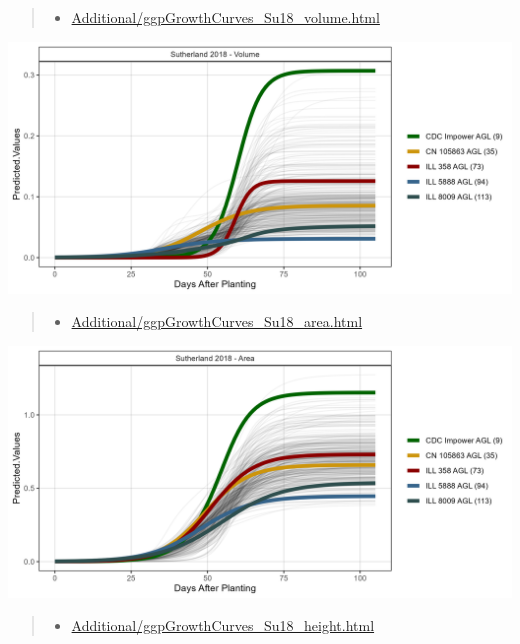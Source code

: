 \documentclass[
]{article}
\providecommand{\tightlist}{%
  \setlength{\itemsep}{0pt}\setlength{\parskip}{0pt}}
\begin{document}
\begin{quote}
\begin{itemize}
\tightlist
\item
  \href{https://derekmichaelwright.github.io/AGILE_LDP_UAV/Additional/ggpGrowthCurves_Su18_volume.html}{Additional/ggpGrowthCurves\_Su18\_volume.html}
\end{itemize}
\end{quote}

\includegraphics{Additional/ggGrowthCurves_Su18_volume.png}

\begin{quote}
\begin{itemize}
\tightlist
\item
  \href{https://derekmichaelwright.github.io/AGILE_LDP_UAV/Additional/ggpGrowthCurves_Su18_area.html}{Additional/ggpGrowthCurves\_Su18\_area.html}
\end{itemize}
\end{quote}

\includegraphics{Additional/ggGrowthCurves_Su18_area.png}

\begin{quote}
\begin{itemize}
\tightlist
\item
  \href{https://derekmichaelwright.github.io/AGILE_LDP_UAV/Additional/ggpGrowthCurves_Su18_height.html}{Additional/ggpGrowthCurves\_Su18\_height.html}
\end{itemize}
\end{quote}
\end{document}
